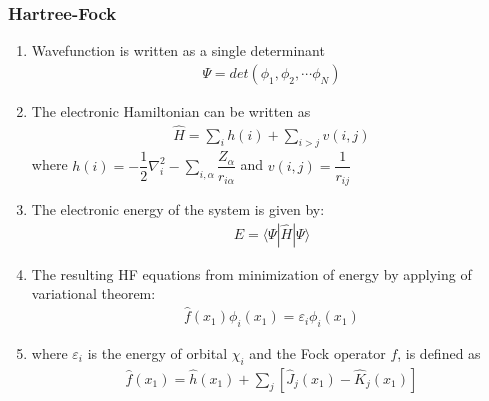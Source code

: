 \documentclass[slidestop,mathserif,compress,xcolor=svgnames]{beamer}
\begin{document}
\begin{frame}
  \frametitle{\small Hartree-Fock}
  \begin{enumerate}
    \item Wavefunction is written as a single determinant
    \begin{align*}
      \Psi = det(\phi_1,\phi_2,\cdots\phi_N)
    \end{align*}
    \item The electronic Hamiltonian can be written as
    \begin{align*}
      \hat{H} = \sum_ih(i) + \sum_{i>j}v(i,j)
    \end{align*}
    where $\displaystyle{h(i) = -\dfrac{1}{2}\nabla^2_i - \sum_{i,\alpha}\dfrac{Z_\alpha}{r_{i\alpha}}}$ and $v(i,j) =\dfrac{1}{r_{ij}}$
    \item The electronic energy of the system is given by:
    \begin{align*}
      E = \langle\Psi|\hat{H}|\Psi\rangle
    \end{align*}
    \item The resulting HF equations from minimization of energy by applying of variational theorem:
    \begin{align*}
      \hat{f}(x_1)\phi_i(x_1)= \varepsilon_i\phi_i(x_1)
    \end{align*}
    \item[] where $\varepsilon_i$ is the energy of orbital $\chi_i$ and the Fock operator $f$, is defined as
    \begin{align*}
      \hat{f}(x_1) = \hat{h}(x_1) + \sum_j\left[\hat{J}_j(x_1)-\hat{K}_j(x_1)\right]
    \end{align*}
  \end{enumerate}
\end{frame}
\end{document}
